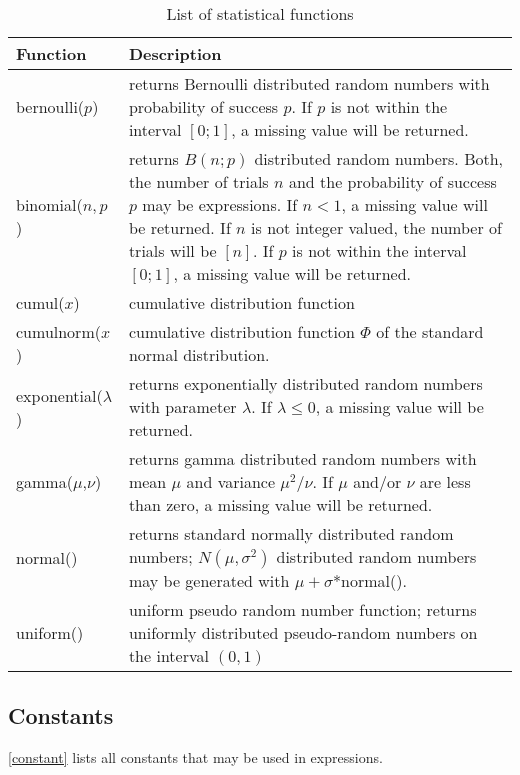 \begin{table}[ht]
\begin{center}
\begin{tabular}{|l|p{11cm}|}
\hline
{\bf Function} & {\bf Description} \\
\hline \hline bernoulli($p$) & returns Bernoulli distributed
random numbers with probability of success $p$. If $p$ is not
within the interval $[0;1]$, a
 missing value will be returned. \\
\hline binomial($n,p$) & returns $B(n;p)$ distributed random
numbers. Both, the number of trials $n$ and the probability of
success $p$ may be expressions. If $n < 1$, a missing value will
be returned. If $n$ is not integer valued, the number of trials
will be $[n]$. If $p$ is not within the interval $[0;1]$, a
missing value will be returned. \\
\hline
cumul($x$) & cumulative distribution function \\
\hline
cumulnorm($x$) & cumulative distribution function $\Phi$ of the standard normal distribution. \\
\hline exponential($\lambda$) & returns exponentially distributed
random numbers with parameter $\lambda$.
If $\lambda \leq 0$, a missing value will be returned. \\
\hline gamma($\mu$,$\nu$) & returns gamma distributed random
numbers with mean $\mu$ and variance $\mu^2/ \nu$.
If $\mu$ and/or $\nu$ are less than zero, a missing value will be returned.  \\
\hline normal() & returns standard normally distributed random
numbers;
$N(\mu,\sigma^2)$ distributed random numbers may be generated with $\mu + \sigma$*normal(). \\
\hline uniform() & uniform pseudo random number function; returns
uniformly distributed
pseudo-random numbers on the interval $(0,1)$ \\
\hline
\end{tabular}
{\em \caption{\label{statfunc} List of statistical functions}}
\end{center}
\end{table}


\subsection{Constants}
 
 \index{$\pi$} 

\autoref{constant} lists all constants that may be used in expressions.


